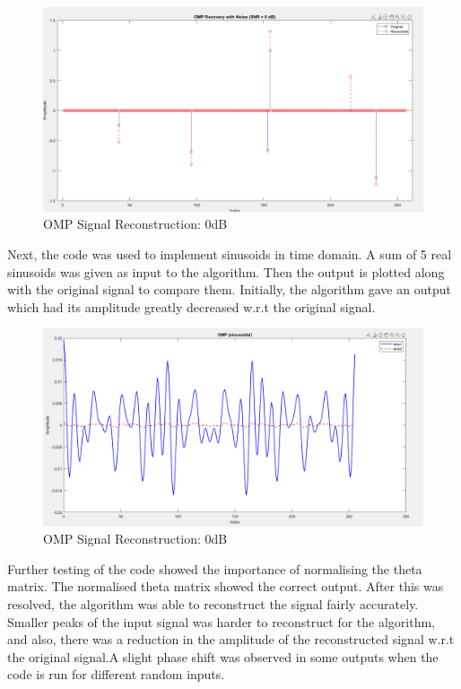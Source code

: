 \documentclass[
  letterpaper,
  DIV=11,
  numbers=noendperiod]{scrartcl}
\begin{document}
\begin{figure}[H]

{\centering \includegraphics[width=0.8\linewidth,height=\textheight,keepaspectratio]{abar-cs_files/mediabag/omp_0db1.png}

}

\caption{OMP Signal Reconstruction: 0dB}

\end{figure}%

Next, the code was used to implement sinusoids in time domain. A sum of
5 real sinusoids was given as input to the algorithm. Then the output is
plotted along with the original signal to compare them. Initially, the
algorithm gave an output which had its amplitude greatly decreased w.r.t
the original signal.

\begin{figure}[H]

{\centering \includegraphics[width=0.8\linewidth,height=\textheight,keepaspectratio]{abar-cs_files/mediabag/omp_err_1.png}

}

\caption{OMP Signal Reconstruction: 0dB}

\end{figure}%

Further testing of the code showed the importance of normalising the
theta matrix. The normalised theta matrix showed the correct output.
After this was resolved, the algorithm was able to reconstruct the
signal fairly accurately. Smaller peaks of the input signal was harder
to reconstruct for the algorithm, and also, there was a reduction in the
amplitude of the reconstructed signal w.r.t the original signal.A slight
phase shift was observed in some outputs when the code is run for
different random inputs.
\end{document}
